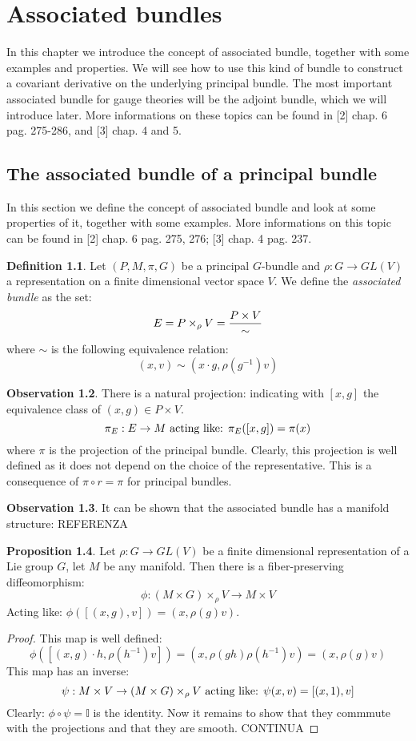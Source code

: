 \documentclass[12pt,a4paper]{report}
\theoremstyle{definition}
\newtheorem{Def}{Definition}[chapter]
\theoremstyle{Theorem}
\newtheorem{Prop}[Def]{Proposition}
\theoremstyle{definition}
\theoremstyle{definition}
\newtheorem{Obs}[Def]{Observation}
\begin{document}
	\chapter{Associated bundles}
	In this chapter we introduce the concept of associated bundle, together with some examples and properties. We will see how to use this kind of bundle to construct a covariant derivative on the underlying principal bundle. The most important associated bundle for gauge theories will be the adjoint bundle, which we will introduce later. More informations on these topics can be found in [2] chap. 6 pag. 275-286, and [3] chap. 4 and 5.
	\section{The associated bundle of a principal bundle}
	In this section we define the concept of associated bundle and look at some properties of it, together with some examples. More informations on this topic can be found in [2] chap. 6 pag. 275, 276; [3] chap. 4 pag. 237.
	\begin{Def}
		Let $(P,M,\pi,G)$ be a principal $G$-bundle and $\rho:G\rightarrow GL(V)$ a representation on a finite dimensional vector space $V$. We define the \textit{associated bundle} as the set: 
		$$E=P\times_\rho V={P\times V\over \sim}$$
		where $\sim$ is the following equivalence relation:
		$$(x,v)\sim(x\cdot g,\rho(g^{-1})v)$$ 
	\end{Def}
	\begin{Obs}
		There is a natural projection: indicating with $[x,g]$ the equivalence class of $(x,g)\in P\times V$.
		$$\pi_E:E\rightarrow M\hbox{ acting like: }\pi_E([x,g])=\pi(x)$$
		where $\pi$ is the projection of the principal bundle. Clearly, this projection is well defined as it does not depend on the choice of the representative. This is a consequence of $\pi\circ r=\pi$ for principal bundles.
	\end{Obs}
	\begin{Obs}
		It can be shown that the associated bundle has a manifold structure: REFERENZA
	\end{Obs}
	\begin{Prop}\label{Prop_6.1.1}
		Let $\rho:G\rightarrow GL(V)$ be a finite dimensional representation of a Lie group $G$, let $M$ be any manifold. Then there is a fiber-preserving diffeomorphism:
		$$\phi:(M\times G)\times_\rho V\rightarrow M\times V$$
		Acting like: $\phi([(x,g),v])=(x,\rho(g)v)$.
	\end{Prop}
	\begin{proof}
		This map is well defined:
		$$\phi([(x,g)\cdot h,\rho(h^{-1})v])=(x,\rho(gh)\rho(h^{-1})v)=(x,\rho(g)v)$$
		This map has an inverse:
		$$\psi:M\times V\rightarrow (M\times G)\times_\rho V\hbox{ acting like: }
		\psi(x,v)=[(x,1),v]$$
		Clearly: $\phi\circ \psi=\mathbb{I}$ is the identity. Now it remains to show that they commmute with the projections and that they are smooth. CONTINUA
	\end{proof}
\end{document}
